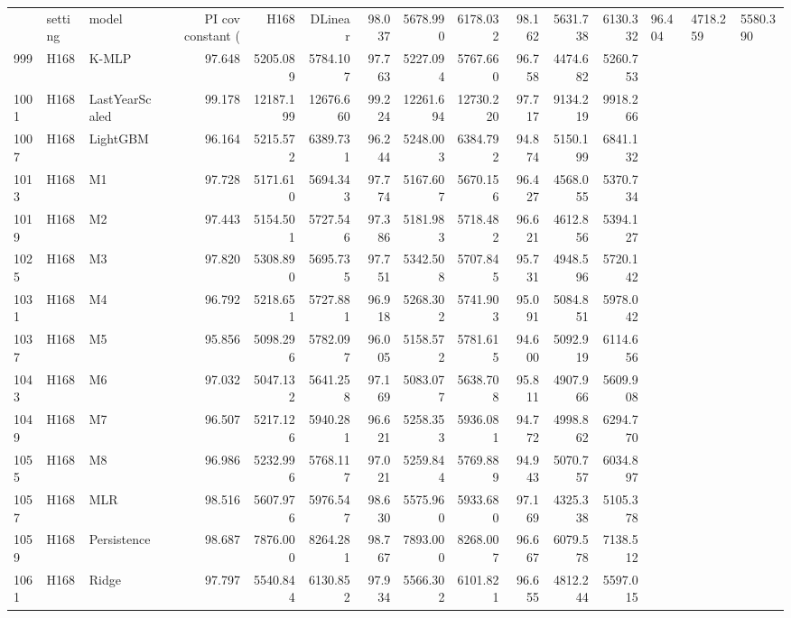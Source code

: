 \begin{tabular}{lllrrrrrrrrr}
\toprule
 & setting & model & PI cov constant (%
 & H168 & DLinear & 98.037 & 5678.990 & 6178.032 & 98.162 & 5631.738 & 6130.332 & 96.404 & 4718.259 & 5580.390 \\
999 & H168 & K-MLP & 97.648 & 5205.089 & 5784.107 & 97.763 & 5227.094 & 5767.660 & 96.758 & 4474.682 & 5260.753 \\
1001 & H168 & LastYearScaled & 99.178 & 12187.199 & 12676.660 & 99.224 & 12261.694 & 12730.220 & 97.717 & 9134.219 & 9918.266 \\
1007 & H168 & LightGBM & 96.164 & 5215.572 & 6389.731 & 96.244 & 5248.003 & 6384.792 & 94.874 & 5150.199 & 6841.132 \\
1013 & H168 & M1 & 97.728 & 5171.610 & 5694.343 & 97.774 & 5167.607 & 5670.156 & 96.427 & 4568.055 & 5370.734 \\
1019 & H168 & M2 & 97.443 & 5154.501 & 5727.546 & 97.386 & 5181.983 & 5718.482 & 96.621 & 4612.856 & 5394.127 \\
1025 & H168 & M3 & 97.820 & 5308.890 & 5695.735 & 97.751 & 5342.508 & 5707.845 & 95.731 & 4948.596 & 5720.142 \\
1031 & H168 & M4 & 96.792 & 5218.651 & 5727.881 & 96.918 & 5268.302 & 5741.903 & 95.091 & 5084.851 & 5978.042 \\
1037 & H168 & M5 & 95.856 & 5098.296 & 5782.097 & 96.005 & 5158.572 & 5781.615 & 94.600 & 5092.919 & 6114.656 \\
1043 & H168 & M6 & 97.032 & 5047.132 & 5641.258 & 97.169 & 5083.077 & 5638.708 & 95.811 & 4907.966 & 5609.908 \\
1049 & H168 & M7 & 96.507 & 5217.126 & 5940.281 & 96.621 & 5258.353 & 5936.081 & 94.772 & 4998.862 & 6294.770 \\
1055 & H168 & M8 & 96.986 & 5232.996 & 5768.117 & 97.021 & 5259.844 & 5769.889 & 94.943 & 5070.757 & 6034.897 \\
1057 & H168 & MLR & 98.516 & 5607.976 & 5976.547 & 98.630 & 5575.960 & 5933.680 & 97.169 & 4325.338 & 5105.378 \\
1059 & H168 & Persistence & 98.687 & 7876.000 & 8264.281 & 98.767 & 7893.000 & 8268.007 & 96.667 & 6079.578 & 7138.512 \\
1061 & H168 & Ridge & 97.797 & 5540.844 & 6130.852 & 97.934 & 5566.302 & 6101.821 & 96.655 & 4812.244 & 5597.015 \\

\end{tabular}
